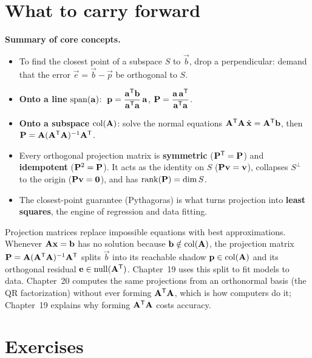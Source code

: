 \section{What to carry forward}

\begin{focusbox}
\textbf{Summary of core concepts.}
\begin{itemize}
  \item To find the closest point of a subspace $S$ to $\vec{b}$, drop a perpendicular: demand
        that the error $\vec{e}=\vec{b}-\vec{p}$ be orthogonal to $S$.
  \item \textbf{Onto a line} $\operatorname{span}(\mathbf{a})$:
        $\;\mathbf{p}=\dfrac{\mathbf{a}^{\mathsf{T}}\mathbf{b}}{\mathbf{a}^{\mathsf{T}}\mathbf{a}}\,\mathbf{a}$,
        \; $\mathbf{P}=\dfrac{\mathbf{a}\,\mathbf{a}^{\mathsf{T}}}{\mathbf{a}^{\mathsf{T}}\mathbf{a}}$.
  \item \textbf{Onto a subspace} $\operatorname{col}(\mathbf{A})$: solve the normal equations
        $\mathbf{A}^{\mathsf{T}}\mathbf{A}\,\hat{\mathbf{x}}=\mathbf{A}^{\mathsf{T}}\mathbf{b}$, then
        $\mathbf{P}=\mathbf{A}(\mathbf{A}^{\mathsf{T}}\mathbf{A})^{-1}\mathbf{A}^{\mathsf{T}}$.
  \item Every orthogonal projection matrix is \textbf{symmetric} ($\mathbf{P}^{\mathsf{T}}=\mathbf{P}$) and \textbf{idempotent}
        ($\mathbf{P}^2=\mathbf{P}$). It acts as the identity on $S$ ($\mathbf{P}\mathbf{v}=\mathbf{v}$), collapses
        $S^\perp$ to the origin ($\mathbf{P}\mathbf{v}=\mathbf{0}$), and has $\operatorname{rank}(\mathbf{P}) = \dim S$.
  \item The closest-point guarantee (Pythagoras) is what turns projection into \textbf{least
        squares}, the engine of regression and data fitting.
\end{itemize}
\end{focusbox}

\begin{connectionbox}
Projection matrices replace impossible equations with best approximations. Whenever
$\mathbf{A}\mathbf{x}=\mathbf{b}$ has no solution because $\mathbf{b} \notin \operatorname{col}(\mathbf{A})$, the projection
matrix $\mathbf{P} = \mathbf{A}(\mathbf{A}^{\mathsf{T}}\mathbf{A})^{-1}\mathbf{A}^{\mathsf{T}}$ splits $\vec{b}$ into its reachable
shadow $\mathbf{p} \in \operatorname{col}(\mathbf{A})$ and its orthogonal residual $\mathbf{e} \in \operatorname{null}(\mathbf{A}^{\mathsf{T}})$.
Chapter~19 uses this split to fit models to data. Chapter~20 computes the same projections from an
orthonormal basis (the QR factorization) without ever forming $\mathbf{A}^{\mathsf{T}}\mathbf{A}$, which is how
computers do it; Chapter~19 explains why forming $\mathbf{A}^{\mathsf{T}}\mathbf{A}$ costs accuracy.
\end{connectionbox}

\section{Exercises}

